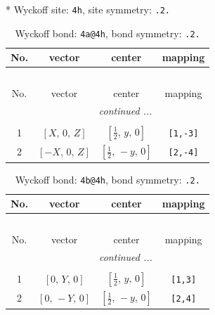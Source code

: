 \documentclass[fleqn,8pt]{jsarticle}
\begin{document}
* Wyckoff site: {\tt 4h}, site symmetry: {\tt .2.}
\renewcommand{\arraystretch}{1.2}
\begin{longtable}{cccc}
\caption{Wyckoff bond: {\tt 4a@4h}, bond symmetry: {\tt .2.}}
 \\
 \hline \hline
No. & vector & center & mapping \\ \hline \endfirsthead

\multicolumn{3}{l}{\tablename\ \thetable{}} \\
 \hline \hline
No. & vector & center & mapping \\ \hline \endhead

 \hline \hline
\multicolumn{3}{r}{\footnotesize\it continued ...} \\ \endfoot

 \hline \hline
\multicolumn{3}{r}{} \\ \endlastfoot

1 & $\left[ X,\, 0,\, Z \right]$ & $\left[ \frac{1}{2},\, y,\, 0 \right]$ & {\tt [1,-3]} \\ \hline
2 & $\left[ - X,\, 0,\, Z \right]$ & $\left[ \frac{1}{2},\, - y,\, 0 \right]$ & {\tt [2,-4]} \\
\end{longtable}
\renewcommand{\arraystretch}{1.2}
\begin{longtable}{cccc}
\caption{Wyckoff bond: {\tt 4b@4h}, bond symmetry: {\tt .2.}}
 \\
 \hline \hline
No. & vector & center & mapping \\ \hline \endfirsthead

\multicolumn{3}{l}{\tablename\ \thetable{}} \\
 \hline \hline
No. & vector & center & mapping \\ \hline \endhead

 \hline \hline
\multicolumn{3}{r}{\footnotesize\it continued ...} \\ \endfoot

 \hline \hline
\multicolumn{3}{r}{} \\ \endlastfoot

1 & $\left[ 0,\, Y,\, 0 \right]$ & $\left[ \frac{1}{2},\, y,\, 0 \right]$ & {\tt [1,3]} \\ \hline
2 & $\left[ 0,\, - Y,\, 0 \right]$ & $\left[ \frac{1}{2},\, - y,\, 0 \right]$ & {\tt [2,4]} \\
\end{longtable}
\renewcommand{\arraystretch}{1.2}
\end{document}
